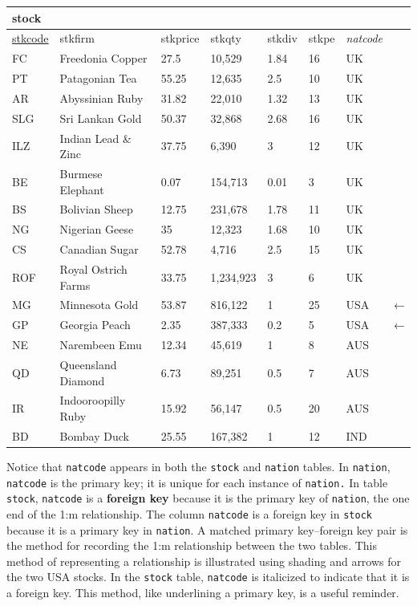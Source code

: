\documentclass[
]{article}
\begin{document}
\begin{longtable}[]{@{}llllllll@{}}
\toprule
stock & & & & & & & \\
\midrule
\endhead
\underline{stkcode} & stkfirm & stkprice & stkqty & stkdiv & stkpe & \emph{natcode} & \\
FC & Freedonia Copper & 27.5 & 10,529 & 1.84 & 16 & UK & \\
PT & Patagonian Tea & 55.25 & 12,635 & 2.5 & 10 & UK & \\
AR & Abyssinian Ruby & 31.82 & 22,010 & 1.32 & 13 & UK & \\
SLG & Sri Lankan Gold & 50.37 & 32,868 & 2.68 & 16 & UK & \\
ILZ & Indian Lead \& Zinc & 37.75 & 6,390 & 3 & 12 & UK & \\
BE & Burmese Elephant & 0.07 & 154,713 & 0.01 & 3 & UK & \\
BS & Bolivian Sheep & 12.75 & 231,678 & 1.78 & 11 & UK & \\
NG & Nigerian Geese & 35 & 12,323 & 1.68 & 10 & UK & \\
CS & Canadian Sugar & 52.78 & 4,716 & 2.5 & 15 & UK & \\
ROF & Royal Ostrich Farms & 33.75 & 1,234,923 & 3 & 6 & UK & \\
MG & Minnesota Gold & 53.87 & 816,122 & 1 & 25 & USA & ← \\
GP & Georgia Peach & 2.35 & 387,333 & 0.2 & 5 & USA & ← \\
NE & Narembeen Emu & 12.34 & 45,619 & 1 & 8 & AUS & \\
QD & Queensland Diamond & 6.73 & 89,251 & 0.5 & 7 & AUS & \\
IR & Indooroopilly Ruby & 15.92 & 56,147 & 0.5 & 20 & AUS & \\
BD & Bombay Duck & 25.55 & 167,382 & 1 & 12 & IND & \\
\bottomrule
\end{longtable}

Notice that \texttt{natcode} appears in both the \texttt{stock} and \texttt{nation} tables.
In \texttt{nation}, \texttt{natcode} is the primary key; it is unique for each
instance of \texttt{nation.} In table \texttt{stock}, \texttt{natcode} is a \textbf{foreign key}
because it is the primary key of \texttt{nation}, the one end of the 1:m
relationship. The column \texttt{natcode} is a foreign key in \texttt{stock} because
it is a primary key in \texttt{nation}. A matched primary key--foreign key pair
is the method for recording the 1:m relationship between the two tables.
This method of representing a relationship is illustrated using shading
and arrows for the two USA stocks. In the \texttt{stock} table, \texttt{natcode} is
italicized to indicate that it is a foreign key. This method, like
underlining a primary key, is a useful reminder.
\end{document}
